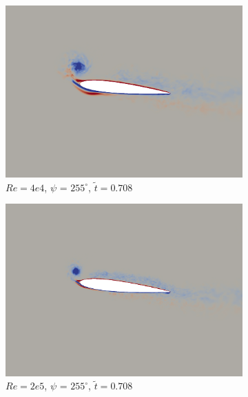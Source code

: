 \begin{figure}[H]
	\begin{subfigure}[b]{0.32\textwidth}
		\centering
		\includegraphics[width=1\textwidth]{figures/Vorticity_plots/Re_40k_1pt2/phase_255.png}
		\caption{$Re=4e4$, $\psi$ = $255^\circ$, $\tilde{t}=0.708$}
		\label{fig:Re_40k_1pt2_phi255}
	\end{subfigure}
	\begin{subfigure}[b]{0.32\textwidth}
		\centering
		\includegraphics[width=1\textwidth]{figures/Vorticity_plots/Re_200k_1pt2/phase_255.png}
		\caption{$Re=2e5$, $\psi$ = $255^\circ$, $\tilde{t}=0.708$}
		\label{fig:Re_200k_1pt2_phi255}
	\end{subfigure}
	\begin{subfigure}[b]{0.32\textwidth}
		\centering

\end{subfigure}
\end{figure}
